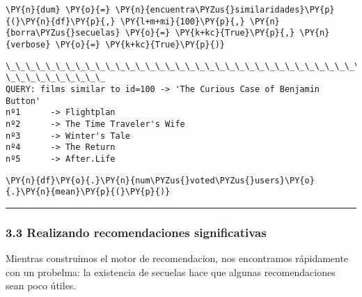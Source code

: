     \begin{tcolorbox}[breakable, size=fbox, boxrule=1pt, pad at break*=1mm,colback=cellbackground, colframe=cellborder]
\begin{Verbatim}[commandchars=\\\{\}]
\PY{n}{dum} \PY{o}{=} \PY{n}{encuentra\PYZus{}similaridades}\PY{p}{(}\PY{n}{df}\PY{p}{,} \PY{l+m+mi}{100}\PY{p}{,} \PY{n}{borra\PYZus{}secuelas} \PY{o}{=} \PY{k+kc}{True}\PY{p}{,} \PY{n}{verbose} \PY{o}{=} \PY{k+kc}{True}\PY{p}{)}
\end{Verbatim}
\end{tcolorbox}

    \begin{Verbatim}[commandchars=\\\{\}]
\_\_\_\_\_\_\_\_\_\_\_\_\_\_\_\_\_\_\_\_\_\_\_\_\_\_\_\_\_\_\_\_\_\_\_\_\_\_\_\_\_\_\_\_\_\_\_\_\_\_\_\_\_\_\_\_\_\_\_\_\_\_\_\_\_\_\_\_\_\_\_\_\_\_\_\_\_\_\_\_
\_\_\_\_\_\_\_\_\_\_
QUERY: films similar to id=100 -> 'The Curious Case of Benjamin Button'
nº1      -> Flightplan
nº2      -> The Time Traveler's Wife
nº3      -> Winter's Tale
nº4      -> The Return
nº5      -> After.Life
    \end{Verbatim}

    \begin{tcolorbox}[breakable, size=fbox, boxrule=1pt, pad at break*=1mm,colback=cellbackground, colframe=cellborder]
\begin{Verbatim}[commandchars=\\\{\}]
\PY{n}{df}\PY{o}{.}\PY{n}{num\PYZus{}voted\PYZus{}users}\PY{o}{.}\PY{n}{mean}\PY{p}{(}\PY{p}{)}
\end{Verbatim}
\end{tcolorbox}

    \begin{center}\rule{0.5\linewidth}{0.5pt}\end{center}

\hypertarget{realizando-recomendaciones-significativas}{%
\subsubsection{3.3 Realizando recomendaciones
significativas}\label{realizando-recomendaciones-significativas}}

    Mientras construimos el motor de recomendacion, nos encontramos
rápidamente con un probelma: la existencia de secuelas hace que algunas
recomendaciones sean poco útiles.

